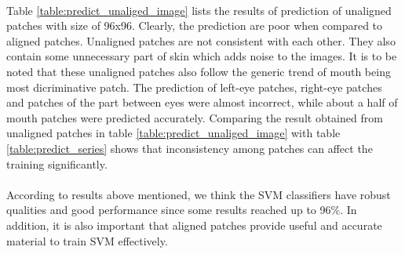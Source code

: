 \\
Table \ref{table:predict_unaliged_image} lists the results of prediction of unaligned patches with size of 96x96. Clearly, the prediction are poor when compared to aligned patches. Unaligned patches are not consistent with each other. They also contain some unnecessary part of skin which adds noise to the images. It is to be noted that these unaligned patches also follow the generic trend of mouth being most dicriminative patch. The prediction of left-eye patches, right-eye patches and patches of the part between eyes were almost incorrect, while about a half of mouth patches were predicted accurately. Comparing the result obtained from unaligned patches in table \ref{table:predict_unaliged_image} with table \ref{table:predict_series} shows that inconsistency among patches can affect the training significantly.
\\
\\
According to results above mentioned, we think the SVM classifiers have robust qualities and good performance since some results reached up to 96\%. In addition, it is also important that aligned patches provide useful and accurate material to train SVM effectively.
